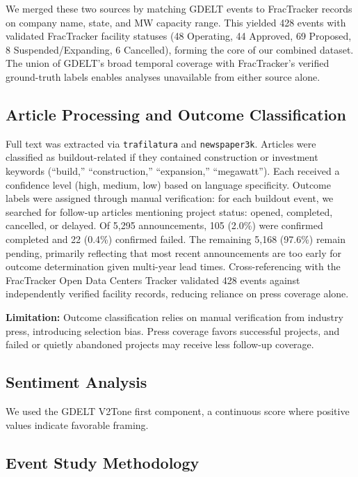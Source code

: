 \documentclass[5p,12pt]{elsarticle}
\begin{document}
We merged these two sources by matching GDELT events to FracTracker records on company name, state, and MW capacity range. This yielded 428 events with validated FracTracker facility statuses (48 Operating, 44 Approved, 69 Proposed, 8 Suspended/Expanding, 6 Cancelled), forming the core of our combined dataset. The union of GDELT's broad temporal coverage with FracTracker's verified ground-truth labels enables analyses unavailable from either source alone.

\subsection{Article Processing and Outcome Classification}

Full text was extracted via \texttt{trafilatura} and \texttt{newspaper3k}. Articles were classified as buildout-related if they contained construction or investment keywords (``build,'' ``construction,'' ``expansion,'' ``megawatt''). Each received a confidence level (high, medium, low) based on language specificity. Outcome labels were assigned through manual verification: for each buildout event, we searched for follow-up articles mentioning project status: opened, completed, cancelled, or delayed. Of 5,295 announcements, 105 (2.0\%) were confirmed completed and 22 (0.4\%) confirmed failed. The remaining 5,168 (97.6\%) remain pending, primarily reflecting that most recent announcements are too early for outcome determination given multi-year lead times. Cross-referencing with the FracTracker Open Data Centers Tracker validated 428 events against independently verified facility records, reducing reliance on press coverage alone.

\noindent\textbf{Limitation:} Outcome classification relies on manual verification from industry press, introducing selection bias. Press coverage favors successful projects, and failed or quietly abandoned projects may receive less follow-up coverage.

\subsection{Sentiment Analysis}

We used the GDELT V2Tone first component, a continuous score where positive values indicate favorable framing.

\subsection{Event Study Methodology}
\end{document}
